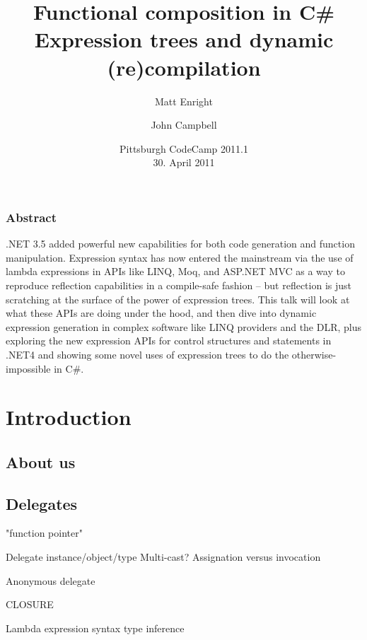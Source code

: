 \documentclass{beamer}
\title{
	Functional composition in C\#\\
	Expression trees and dynamic (re)compilation
}
\author{Matt Enright \and {John Campbell}}
\date[]{
	Pittsburgh CodeCamp 2011.1\\
	30. April 2011
}
\begin{document}

\begin{frame}[plain]
	\frametitle{Abstract}
	.NET 3.5 added powerful new capabilities for both code generation and
	function manipulation. Expression syntax has now entered the mainstream
	via the use of lambda expressions in APIs like LINQ, Moq, and ASP.NET MVC
	as a way to reproduce reflection capabilities in a compile-safe fashion --
	but reflection is just scratching at the surface of the power of
	expression trees. This talk will look at what these APIs are doing under
	the hood, and then dive into dynamic expression generation in complex
	software like LINQ providers and the DLR, plus exploring the new
	expression APIs for control structures and statements in .NET4 and showing
	some novel uses of expression trees to do the otherwise-impossible in
	C\#.
\end{frame}
\frame[plain]{\tableofcontents}

\section{Introduction}
\subsection{About us}
\subsection{Delegates}
	\begin{frame}
		"function pointer"
	\end{frame}
	\begin{frame}
		Delegate instance/object/type
		Multi-cast?
		Assignation versus invocation
	\end{frame}
	\begin{frame}
		Anonymous delegate
	\end{frame}
	\begin{frame}
		CLOSURE
	\end{frame}
	\begin{frame}
		Lambda expression syntax
		type inference
	\end{frame}
\end{document}
